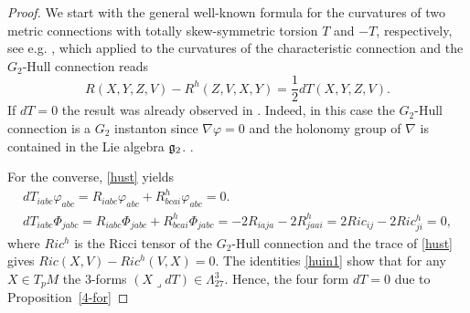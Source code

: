 \documentclass[10pt,british]{article}
\def\sb {{\nabla}}
\def\p{{\varphi}}
\def\ph{{\Phi}}
\begin{document}
\begin{proof}
We start with the general well-known formula for the curvatures of two metric connections with totally skew-symmetric torsion $T$ and $-T$, respectively, see e.g. \cite{MS}, which applied to the curvatures of the characteristic connection and the $G_2$-Hull connection reads
\begin{equation}\label{hust}
R(X,Y,Z,V)-R^h(Z,V,X,Y)=\frac12dT(X,Y,Z,V).
\end{equation}
If $dT=0$ the result was already  observed  in \cite{MS}. Indeed, in this case  the $G_2$-Hull connection is a $G_2$ instanton since $\sb\p=0$ and the holonomy group of $\sb$ is contained in the Lie algebra $\frak{g}_2$. \cite{MS}.

For the converse, \eqref{hust} yields
\begin{equation}\label{huin1}
\begin{split}
dT_{iabc}\p_{abc}=R_{iabc}\p_{abc}+R^h_{bcai}\p_{abc}=0.\\
dT_{iabc}\ph_{jabc}=R_{iabc}\ph_{jabc}+R^h_{bcai}\ph_{jabc}=-2R_{iaja}-2R^h_{jaai}=2Ric_{ij}-2Ric^h_{ji}=0,
\end{split}
\end{equation}
where $Ric^h$ is the Ricci tensor of the $G_2$-Hull connection and  the trace of \eqref{hust} gives $Ric(X,V)-Ric^h(V,X)=0.$
The identities \eqref{huin1} show that for any $X\in T_pM$ the 3-forms  $(X\lrcorner dT)\in \Lambda^3_{27}$. Hence, the four form $dT=0$ due to Proposition~\ref{4-for} 
\end{proof}
\end{document}
